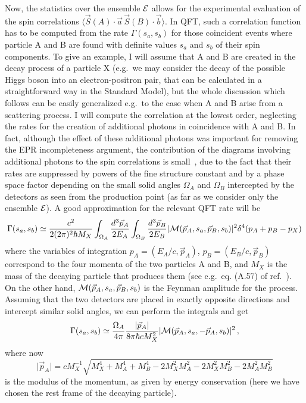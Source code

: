 \documentclass[published]{JHEP3}
\begin{document}
Now, the statistics over the ensemble ${\cal E}$ allows for the
experimental evaluation of the spin correlations $\langle\vec S(A)
\cdot\vec a \,\vec S(B)\cdot\vec b\rangle$. In QFT, such a correlation
function has to be computed from the rate $\Gamma(s_a,s_b)$ for those
coincident events where particle A and B are found with definite
values $s_a$ and $s_b$ of their spin components. To give an example, I
will assume that A and B are created in the decay process of a
particle X (e.g.\ we may consider the decay of the possible Higgs
boson into an electron-positron pair, that can be calculated in a
straightforward way in the Standard Model), but the whole discussion
which follows can be easily generalized e.g.\ to the case when A and B
arise from a scattering process. I will compute the correlation at the
lowest order, neglecting the rates for the creation of additional
photons in coincidence with A and B. In fact, although the effect of
these additional photons was important for removing the EPR
incompleteness argument, the contribution of the diagrams involving
additional photons to the spin correlations is small~\cite{pureprp},
due to the fact that their rates are suppressed by powers of the fine
structure constant and by a phase space factor depending on the small
solid angles $\Omega_A$ and $\Omega_B$ intercepted by the detectors as
seen from the production point (as far as we consider only the
ensemble ${\cal E}$). A good approximation for the relevant QFT rate
will be
\begin{equation}
\Gamma(s_a,s_b) \simeq \frac{c^2}{2(2\pi) ^2\hbar
M_X}\int_{\Omega_A}\frac{d^3\vec
p_A}{2E_A}\int_{\Omega_B}\frac{d^3\vec p_B}{2E_B} \vert {\cal M} (\vec
p_A,s_a,\vec p_B,s_b)\vert^2\delta^4(p_A+p_B-p_X)
\label{eq:2}
\end{equation}
where the variables of integration $p_A=(E_A/c,\vec p_A)$,
$p_B=(E_B/c,\vec p_B)$ correspond to the four momenta of the two
particles A and B, and $M_X$ is the mass of the decaying particle that
produces them (see e.g.\ eq. (A.57) of ref.~\cite{Peskin}).  On the
other hand, ${\cal M} (\vec p_A,s_a,\vec p_B,s_b)$ is the Feynman
amplitude for the process. Assuming that the two detectors are placed
in exactly opposite directions and intercept similar solid angles, we
can perform the integrals and get
\begin{equation}
\Gamma(s_a,s_b) \simeq \frac{\Omega_A}{4\pi}\frac{\vert \vec
p_A\vert}{8\pi\hbar c M_X^2} \vert {\cal M} (\vec p_A,s_a,-\vec
p_A,s_b)\vert^2\,, \label{eq:3}
\end{equation}
where now 
$$
\vert \vec p_A\vert =
cM_X^{-1}\sqrt{M_X^4+M_A^4+M_B^4-2M_X^2M_A^2-2M_X^2M_B^2-2M_A^2M_B^2}
$$
is the modulus of the momentum, as given by energy conservation (here
we have chosen the rest frame of the decaying particle).
\end{document}
